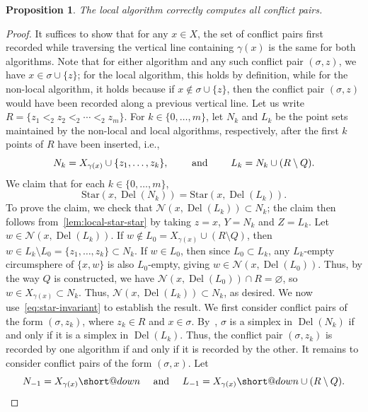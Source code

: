 \documentclass[11pt]{amsart}
\makeatletter
\DeclareMathOperator{\DelT}{Del}
\newcommand{\NN}{\mathcal{N}}
\newcommand{\St}{\mathrm{Star}}
\DeclareRobustCommand{\subdown}{%
  \mathrel{\mathpalette\short@down\relax}%
}
\newcommand{\short@down}[2]{%
  \mkern2mu
  \clipbox{0 0 0 {.45\height}}{$\m@th#1\vphantom{+}{\downarrow}$}%
}
\theoremstyle{plain}
\newtheorem{proposition}[theorem]{Proposition}
\theoremstyle{definition}
\theoremstyle{remark}
\makeatother
\begin{document}
%
\begin{proposition}\label{lem:local-reinsert} 
The local algorithm correctly computes all conflict pairs.
\end{proposition}
%
\begin{proof} 
    It suffices to show that for any $x\in X$, the set of conflict pairs first recorded while traversing the vertical line containing $\gamma(x)$ is the same for both algorithms.  Note that for either algorithm and any such conflict pair $(\sigma, z)$, we have $x\in \sigma\cup \{z\}$; for the local algorithm, this holds by definition, while for the non-local algorithm, it holds because if $x\not\in \sigma\cup \{z\}$, then the conflict pair $(\sigma, z)$ would have been recorded along a previous vertical line.   
%
   Let us write $R= \{z_1 <_2 z_2 <_2 \cdots <_2 z_m\}.$
    For $k\in \{0,\dots,m\}$, let $N_k$ and $L_k$ be the point sets maintained by the 
    non-local and local algorithms, respectively, after the first $k$ points of $R$ have been inserted, i.e., 
    \[
    N_k = X_{ \gamma(x)} \cup \{z_1,\dots,z_{k}\},
    \qquad \textup{ and } \qquad
    L_k = N_k \cup (R\setminus Q).
    \]
    We claim that for each $k\in \{0,\ldots, m\}$, 
    \begin{equation}\label{eq:star-invariant} 
        \St(x,\DelT(N_k))=\St(x,\DelT(L_k)).  %
    \end{equation}
    To prove the claim, we check that $\NN(x, \DelT(L_k)) \subset N_k$; the claim then follows from~\cref{lem:local-star-star} by taking $z = x$, $Y=N_k$ and $Z = L_k$.  Let  $w \in \NN(x, \DelT(L_k))$.   If $w \notin L_0=X_{ \gamma(x)}\cup (R\setminus Q)$, then $w \in L_k \setminus L_0 = \{z_1, \dots, z_{k}\} \subset N_k$.  
    If $w \in L_0$, then since $L_0 \subset L_k$, any  $L_k$-empty circumsphere of 
    $\{x, w\}$ is also $L_0$-empty, giving $w \in \NN(x, \DelT(L_0))$.   Thus, by the way $Q$ is constructed, we have $\NN(x, \DelT(L_0)) \cap R = \varnothing$,
    so $w \in X_{ \gamma(x)} \subset N_k$.  Thus, $\NN(x, \DelT(L_k)) \subset N_k$, as desired.
%
 We now use~\cref{eq:star-invariant} to establish the result.  We first consider conflict pairs of the form $(\sigma,z_k)$, where $z_k\in R$ and $x\in \sigma$.   By~,
 $\sigma$ is a simplex in $\DelT(N_k)$ if and only if it is a simplex in $\DelT(L_k)$.  Thus, the conflict pair $(\sigma,z_k)$ is recorded by one algorithm if and only if it is recorded by the other.
%
It remains to consider conflict pairs of the form $(\sigma,x)$.  Let 
\[N_{-1}=X_{\gamma(x)}{\subdown}\quad \textup{ and } \quad L_{-1}=X_{\gamma(x)}{\subdown}\cup (R\setminus Q).\]

\end{proof}
\end{document}
